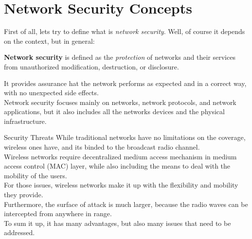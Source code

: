 \chapter{Network Security Concepts}
First of all, lets try to define what is \textit{network security}. Well, of course it depends 
on the context, but in general:
\begin{boxH}
  \textbf{Network security} is defined as the \textit{protection} of networks and their services from unauthorized
  modification, destruction, or disclosure.
\end{boxH}
It provides assurance hat the network performs as expected and in a correct way, with no unexpected 
side effects.\\
Network security focuses mainly on networks, network protocols, and network applications, but it 
also includes all the networks devices and the physical infrastructure.
\begin{subsubsection}{Security Threats}
  While traditional networks have no limitations on the coverage, wireless ones have, and its binded
  to the broadcast radio channel.\\
  Wireless networks require decentralized medium access mechanism in medium access
  control (MAC) layer, while also including the means to deal with the mobility of the users.\\
  For those issues, wireless networks make it up with the flexibility and mobility they provide.\\
  Furthermore, the surface of attack is much larger, because the radio waves can be intercepted
  from anywhere in range.\\
  To sum it up, it has many advantages, but also many issues that need to be addressed.
\end{subsubsection}
